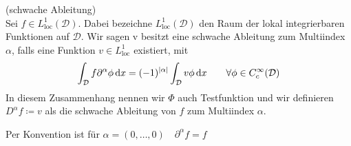\begin{Definition}(schwache Ableitung)\\
	Sei $f \in L_{\text{loc}}^1(\mathcal{D})$. Dabei bezeichne $  L_{\text{loc}}^1(\mathcal{D}) $ den Raum der lokal integrierbaren Funktionen auf $ \mathcal{D} $. Wir sagen v besitzt eine schwache Ableitung zum Multiindex $\alpha$, falls eine Funktion $v \in L_{\text{loc}}^1$ existiert, mit 
		\begin{align*}
			\int_{\mathcal{D}} f \partial^{\alpha} \phi \, \mathrm{d} x = (-1)^{|\alpha|} \int_{\mathcal{D}} v \phi \, \mathrm{d} x \qquad \forall \phi \in C_c^{\infty}(\mathcal{D})
		\end{align*}
	In diesem Zusammenhang nennen wir $\Phi$ auch Testfunktion und wir definieren $D^{\alpha} f \coloneqq v$ als die schwache Ableitung von $f$ zum Multiindex $\alpha$. 
\end{Definition}
\begin{Bemerkung}
	Per Konvention ist für $ \alpha = (0,\dots, 0) \quad \partial^{\alpha}f = f $
\end{Bemerkung}
